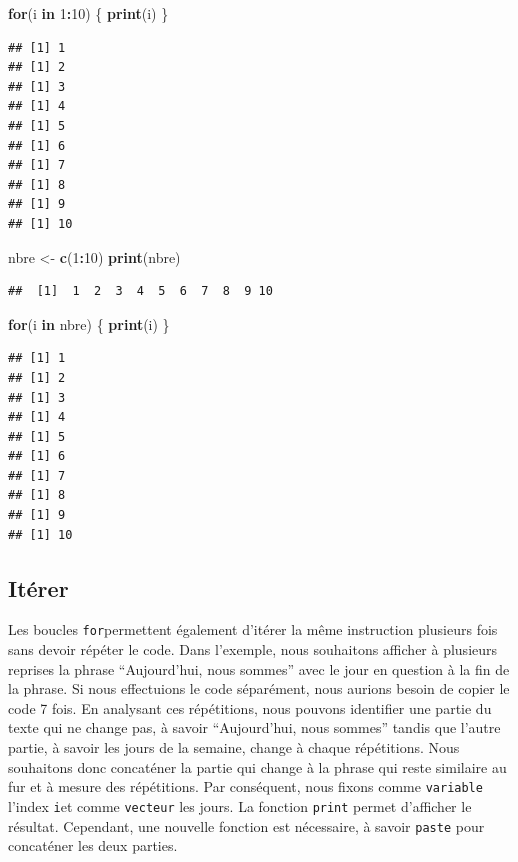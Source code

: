 \documentclass[
]{book}
\newenvironment{Shaded}{\begin{snugshade}}{\end{snugshade}}
\newcommand{\ControlFlowTok}[1]{\textcolor[rgb]{0.13,0.29,0.53}{\textbf{#1}}}
\newcommand{\DecValTok}[1]{\textcolor[rgb]{0.00,0.00,0.81}{#1}}
\newcommand{\FunctionTok}[1]{\textcolor[rgb]{0.13,0.29,0.53}{\textbf{#1}}}
\newcommand{\NormalTok}[1]{#1}
\newcommand{\OtherTok}[1]{\textcolor[rgb]{0.56,0.35,0.01}{#1}}
\newcommand{\SpecialCharTok}[1]{\textcolor[rgb]{0.81,0.36,0.00}{\textbf{#1}}}
\begin{document}
\begin{Shaded}
\begin{Highlighting}[]
\ControlFlowTok{for}\NormalTok{(i }\ControlFlowTok{in} \DecValTok{1}\SpecialCharTok{:}\DecValTok{10}\NormalTok{) \{}
  \FunctionTok{print}\NormalTok{(i)}
\NormalTok{\}}
\end{Highlighting}
\end{Shaded}

\begin{verbatim}
## [1] 1
## [1] 2
## [1] 3
## [1] 4
## [1] 5
## [1] 6
## [1] 7
## [1] 8
## [1] 9
## [1] 10
\end{verbatim}

\begin{Shaded}
\begin{Highlighting}[]
\NormalTok{nbre }\OtherTok{\textless{}{-}} \FunctionTok{c}\NormalTok{(}\DecValTok{1}\SpecialCharTok{:}\DecValTok{10}\NormalTok{)}
\FunctionTok{print}\NormalTok{(nbre)}
\end{Highlighting}
\end{Shaded}

\begin{verbatim}
##  [1]  1  2  3  4  5  6  7  8  9 10
\end{verbatim}

\begin{Shaded}
\begin{Highlighting}[]
\ControlFlowTok{for}\NormalTok{(i }\ControlFlowTok{in}\NormalTok{ nbre) \{}
  \FunctionTok{print}\NormalTok{(i)}
\NormalTok{\}}
\end{Highlighting}
\end{Shaded}

\begin{verbatim}
## [1] 1
## [1] 2
## [1] 3
## [1] 4
## [1] 5
## [1] 6
## [1] 7
## [1] 8
## [1] 9
## [1] 10
\end{verbatim}

\subsection{Itérer}\label{ituxe9rer}

Les boucles \texttt{for}permettent également d'itérer la même instruction plusieurs fois sans devoir répéter le code. Dans l'exemple, nous souhaitons afficher à plusieurs reprises la phrase ``Aujourd'hui, nous sommes'' avec le jour en question à la fin de la phrase. Si nous effectuions le code séparément, nous aurions besoin de copier le code 7 fois. En analysant ces répétitions, nous pouvons identifier une partie du texte qui ne change pas, à savoir ``Aujourd'hui, nous sommes'' tandis que l'autre partie, à savoir les jours de la semaine, change à chaque répétitions. Nous souhaitons donc concaténer la partie qui change à la phrase qui reste similaire au fur et à mesure des répétitions. Par conséquent, nous fixons comme \texttt{variable} l'index \texttt{i}et comme \texttt{vecteur} les jours. La fonction \texttt{print} permet d'afficher le résultat. Cependant, une nouvelle fonction est nécessaire, à savoir \texttt{paste} pour concaténer les deux parties.
\end{document}
